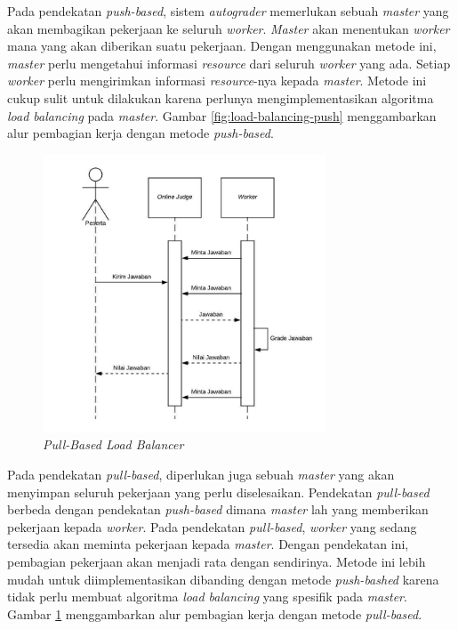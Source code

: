 \par Pada pendekatan \textit{push-based}, sistem \textit{autograder} memerlukan sebuah \textit{master} yang akan membagikan pekerjaan ke seluruh \textit{worker}. \textit{Master} akan menentukan \textit{worker} mana yang akan diberikan suatu pekerjaan. Dengan menggunakan metode ini, \textit{master} perlu mengetahui informasi \textit{resource} dari seluruh \textit{worker} yang ada. Setiap \textit{worker} perlu mengirimkan informasi \textit{resource}-nya kepada \textit{master}. Metode ini cukup sulit untuk dilakukan karena perlunya mengimplementasikan algoritma \textit{load balancing} pada \textit{master}. Gambar \ref{fig:load-balancing-push} menggambarkan alur pembagian kerja dengan metode \textit{push-based}.

\begin{figure}[ht!]
    \centering
    \includegraphics[width=0.75\textwidth]{images/load-balancing-pull}
    \caption{\textit{Pull-Based Load Balancer}}
    \label{fig:load-balancing-pull}
\end{figure}

\par Pada pendekatan \textit{pull-based}, diperlukan juga sebuah \textit{master} yang akan menyimpan seluruh pekerjaan yang perlu diselesaikan. Pendekatan \textit{pull-based} berbeda dengan pendekatan \textit{push-based} dimana \textit{master} lah yang memberikan pekerjaan kepada \textit{worker}. Pada pendekatan \textit{pull-based}, \textit{worker} yang sedang tersedia akan meminta pekerjaan kepada \textit{master}. Dengan pendekatan ini, pembagian pekerjaan akan menjadi rata dengan sendirinya. Metode ini lebih mudah untuk diimplementasikan dibanding dengan metode \textit{push-bashed} karena tidak perlu membuat algoritma \textit{load balancing} yang spesifik pada \textit{master}. Gambar \ref{fig:load-balancing-pull} menggambarkan alur pembagian kerja dengan metode \textit{pull-based}.

